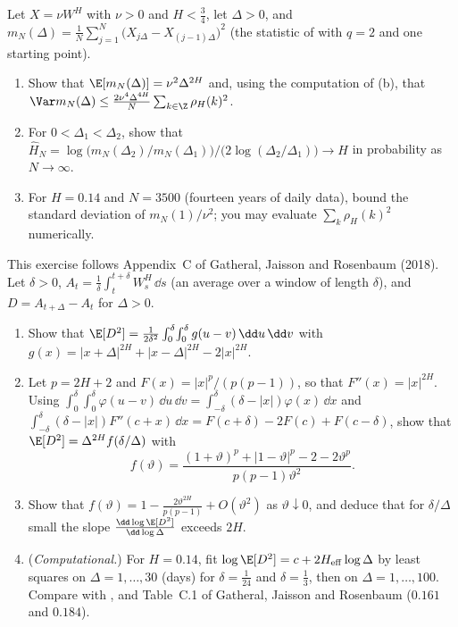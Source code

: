 \begin{exercise}\label{ex:rv-consistency}
\easy Let $X=\nu W^H$ with $\nu>0$ and $H<\frac34$, let $\Delta>0$, and
$m_N(\Delta)=\frac1N\sum_{j=1}^N\big(X_{j\Delta}-X_{(j-1)\Delta}\big)^2$ (the statistic of  with
$q=2$ and one starting point).
\begin{enumerate}[label=(\alph*)]
  \item Show that $\E[m_N(\Delta)]=\nu^2\Delta^{2H}$ and, using the computation of (b), that
    $\Var m_N(\Delta)\le\frac{2\nu^4\Delta^{4H}}N\sum_{k\in\Z}\rho_H(k)^2$.
  \item For $0<\Delta_1<\Delta_2$, show that
    $\hat H_N=\log\big(m_N(\Delta_2)/m_N(\Delta_1)\big)/\big(2\log(\Delta_2/\Delta_1)\big)\to H$ in probability as
    $N\to\infty$.
  \item For $H=0.14$ and $N=3500$ (fourteen years of daily data), bound the standard deviation of
    $m_N(1)/\nu^2$; you may evaluate $\sum_k\rho_H(k)^2$ numerically.
\end{enumerate}
\end{exercise}

\begin{exercise}\label{ex:rv-smoothing}
\medium This exercise follows Appendix~C of Gatheral, Jaisson and Rosenbaum (2018). Let $\delta>0$,
$A_t=\frac1\delta\int_t^{t+\delta}W^H_s\,\dd s$ (an average over a window of length $\delta$), and $D=A_{t+\Delta}-A_t$ for
$\Delta>0$.
\begin{enumerate}[label=(\alph*)]
  \item Show that $\E[D^2]=\frac1{2\delta^2}\int_0^\delta\!\int_0^\delta g(u-v)\,\dd u\,\dd v$ with
    $g(x)=|x+\Delta|^{2H}+|x-\Delta|^{2H}-2|x|^{2H}$.
  \item Let $p=2H+2$ and $F(x)=|x|^p/(p(p-1))$, so that $F''(x)=|x|^{2H}$. Using
    $\int_0^\delta\!\int_0^\delta\varphi(u-v)\,\dd u\,\dd v=\int_{-\delta}^\delta(\delta-|x|)\varphi(x)\,\dd x$ and
    $\int_{-\delta}^\delta(\delta-|x|)F''(c+x)\,\dd x=F(c+\delta)-2F(c)+F(c-\delta)$, show that $\E[D^2]=\Delta^{2H}f(\delta/\Delta)$
    with
    \[
      f(\vartheta)=\frac{(1+\vartheta)^p+|1-\vartheta|^p-2-2\vartheta^p}{p(p-1)\vartheta^2}.
    \]
  \item Show that $f(\vartheta)=1-\frac{2\vartheta^{2H}}{p(p-1)}+O(\vartheta^2)$ as $\vartheta\downarrow0$, and deduce that for
    $\delta/\Delta$ small the slope $\frac{\dd\log\E[D^2]}{\dd\log\Delta}$ exceeds $2H$.
  \item (\emph{Computational.}) For $H=0.14$, fit $\log\E[D^2]=c+2H_{\mathrm{eff}}\log\Delta$ by least squares on
    $\Delta=1,\dots,30$ (days) for $\delta=\frac1{24}$ and $\delta=\frac13$, then on $\Delta=1,\dots,100$. Compare with
    ,  and Table~C.1 of Gatheral, Jaisson and Rosenbaum ($0.161$ and $0.184$).
\end{enumerate}
\end{exercise}

